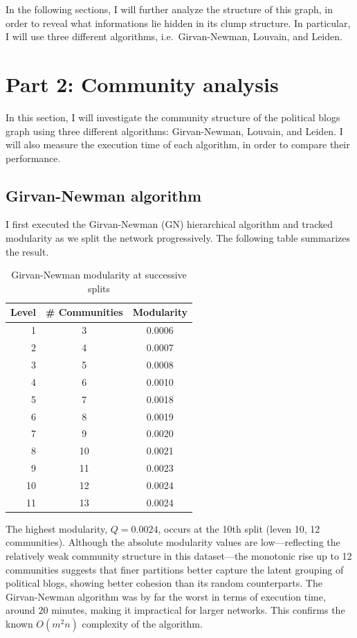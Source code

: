 \documentclass{article}
\begin{document}
In the following sections, I will further analyze the structure of this graph, in order to reveal what informations lie hidden in its clump structure. In particular, I will use three different algorithms, i.e.\ Girvan-Newman, Louvain, and Leiden. 


\section{Part 2: Community analysis}\label{sec:part2}
In this section, I will investigate the community structure of the political blogs graph using three different algorithms: Girvan-Newman, Louvain, and Leiden. I will also measure the execution time of each algorithm, in order to compare their performance.

\subsection{Girvan-Newman algorithm}
I first executed the Girvan-Newman (GN) hierarchical algorithm and tracked modularity as we split the network progressively. The following table summarizes the result.

\begin{table}[H]
  \centering
  \caption{Girvan-Newman modularity at successive splits}
  \label{tab:gn-modularity}
  \begin{tabular}{r c c}
    \toprule
    \textbf{Level} & \textbf{\# Communities} & \textbf{Modularity} \\
    \midrule
     1  &  3  & 0.0006 \\
     2  &  4  & 0.0007 \\
     3  &  5  & 0.0008 \\
     4  &  6  & 0.0010 \\
     5  &  7  & 0.0018 \\
     6  &  8  & 0.0019 \\
     7  &  9  & 0.0020 \\
     8  & 10  & 0.0021 \\
     9  & 11  & 0.0023 \\
    10  & 12  & 0.0024 \\
    11  & 13  & 0.0024 \\
    \bottomrule
  \end{tabular}
\end{table}

The highest modularity, $Q = 0.0024$, occurs at the 10th split (leven 10, 12 communities). 
Although the absolute modularity values are low—reflecting the relatively weak community structure in this dataset—the monotonic rise up to 12 communities suggests that finer partitions better capture the latent grouping of political blogs, showing better cohesion than its random counterparts.
The Girvan-Newman algorithm was by far the worst in terms of execution time, around $20$ minutes, making it impractical for larger networks. This confirms the known $O(m^{2}n)$ complexity of the algorithm.
\end{document}
